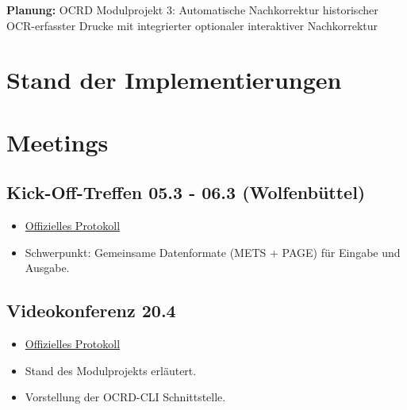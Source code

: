 \begin{NoHyper}

\begin{LARGE}
\textbf{Planung:} OCRD Modulprojekt 3:
\glqq Automatische Nachkorrektur historischer OCR-erfasster Drucke 
mit integrierter optionaler interaktiver Nachkorrektur\grqq{} 
\end{LARGE}

\tableofcontents
\end{NoHyper}

\section{Stand der Implementierungen}

\section{Meetings}
\subsection {Kick-Off-Treffen 05.3 - 06.3 (Wolfenbüttel)}

\begin{itemize}
  \item \href{https://wiki.de.dariah.eu/pages/viewpage.action?pageId=64949522}{Offizielles Protokoll}
  \item Schwerpunkt: Gemeinsame Datenformate (METS + PAGE) für Eingabe und Ausgabe.
\end{itemize}

\subsection {Videokonferenz  20.4}

\begin{itemize}
\item \href{https://wiki.de.dariah.eu/display/OCR/2018-04-20+Besprechungsnotizen}{Offizielles Protokoll
}
\item Stand des Modulprojekts erläutert.
\item Vorstellung der OCRD-CLI Schnittstelle.
\end{itemize}



